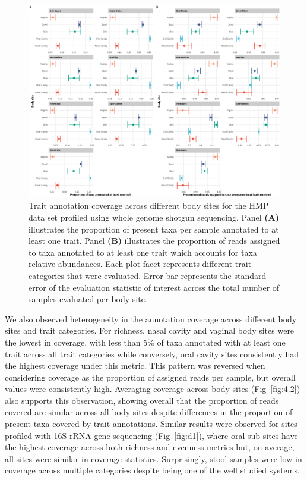 \begin{figure}[!h]
\includegraphics[width=0.99\linewidth]{figures/ch4_f1.eps}
\caption[Trait annotation coverage across different body sites for the HMP data set profiled using whole genome shotgun sequencing]{Trait annotation coverage across different body sites for the HMP data set profiled using whole genome shotgun sequencing. Panel \textbf{(A)} illustrates the proportion of present taxa per sample annotated to at least one trait. Panel \textbf{(B)} illustrates the proportion of reads assigned to taxa annotated to at least one trait which accounts for taxa relative abundances. Each plot facet represents different trait categories that were evaluated. Error bar represents the standard error of the evaluation statistic of interest across the total number of samples evaluated per body site.}
\label{fig:4.1}
\end{figure}

We also observed heterogeneity in the annotation coverage across different body sites and trait categories. For richness, nasal cavity and vaginal body sites were the lowest in coverage, with less than 5\% of taxa annotated with at least one trait across all trait categories while conversely, oral cavity sites consistently had the highest coverage under this metric. This pattern was reversed when considering coverage as the proportion of assigned reads per sample, but overall values were consistently high. Averaging coverage across body sites (Fig~\ref{fig:4.2}) also supports this observation, showing overall that the proportion of reads covered are similar across all body sites despite differences in the proportion of present taxa covered by trait annotations. Similar results were observed for sites profiled with 16S rRNA gene sequencing (Fig~\ref{fig:d1}), where oral sub-sites have the highest coverage across both richness and evenness metrics but, on average, all sites were similar in coverage statistics. Surprisingly, stool samples were low in coverage across multiple categories despite being one of the well studied systems. 

